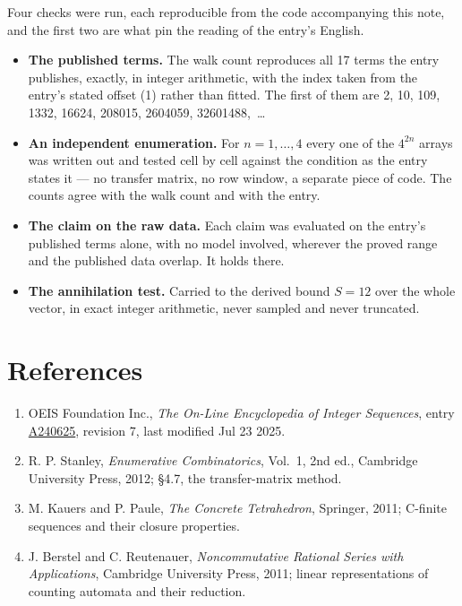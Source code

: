 \documentclass[11pt]{article}
\theoremstyle{definition}
\begin{document}
Four checks were run, each reproducible from the code accompanying this note, and the first two are what pin the reading of the entry's English.

\begin{itemize}

\item {\bfseries The published terms.} The walk count reproduces all 17 terms the entry publishes, exactly, in integer arithmetic, with the index taken from the entry's stated offset (1) rather than fitted. The first of them are 2, 10, 109, 1332, 16624, 208015, 2604059, 32601488,~\dots

\item {\bfseries An independent enumeration.} For $n = 1,\dots,4$ every one of the $4^{2n}$ arrays was written out and tested cell by cell against the condition as the entry states it --- no transfer matrix, no row window, a separate piece of code. The counts agree with the walk count and with the entry.

\item {\bfseries The claim on the raw data.} Each claim was evaluated on the entry's published terms alone, with no model involved, wherever the proved range and the published data overlap. It holds there.

\item {\bfseries The annihilation test.} Carried to the derived bound $S = 12$ over the whole vector, in exact integer arithmetic, never sampled and never truncated.

\end{itemize}

\section{References}

\begin{enumerate}

\item OEIS Foundation Inc., \emph{The On-Line Encyclopedia of Integer Sequences}, entry \href{https://oeis.org/A240625}{A240625}, revision 7, last modified Jul 23 2025.

\item R. P. Stanley, \emph{Enumerative Combinatorics}, Vol.~1, 2nd ed., Cambridge University Press, 2012; \S4.7, the transfer-matrix method.

\item M. Kauers and P. Paule, \emph{The Concrete Tetrahedron}, Springer, 2011; C-finite sequences and their closure properties.

\item J. Berstel and C. Reutenauer, \emph{Noncommutative Rational Series with Applications}, Cambridge University Press, 2011; linear representations of counting automata and their reduction.

\end{enumerate}
\end{document}
